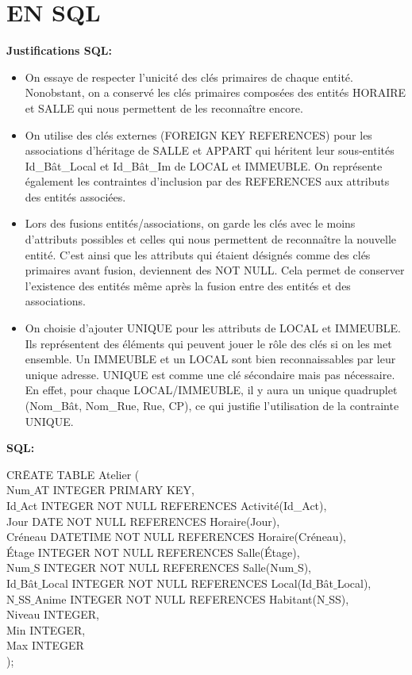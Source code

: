 \documentclass[a4paper,10.5pt]{report}
\begin{document}
	\section*{EN SQL}
	\textbf{Justifications SQL\@: }
	\begin{itemize}
		\item On essaye de respecter l'unicité des clés primaires de chaque entité. Nonobstant, on a conservé les clés primaires composées des entités HORAIRE et SALLE qui nous permettent de les reconnaître encore. 
		\item On utilise des clés externes (FOREIGN KEY REFERENCES) pour les associations d'héritage de SALLE et APPART qui héritent leur sous-entités Id\_Bât\_Local et Id\_Bât\_Im de LOCAL et IMMEUBLE\@. On représente également les contraintes d'inclusion par des REFERENCES aux attributs des entités associées.
		\item Lors des fusions entités/associations, on garde les clés avec le moins d'attributs possibles et celles qui nous permettent de reconnaître la nouvelle entité. C'est ainsi que les attributs qui étaient désignés comme des clés primaires avant fusion, deviennent des NOT NULL\@. Cela permet de conserver l'existence des entités même après la fusion entre des entités et des associations.
		\item On choisie d'ajouter UNIQUE pour les attributs de LOCAL et IMMEUBLE\@. Ils représentent des éléments qui peuvent jouer le rôle des clés si on les met ensemble. Un IMMEUBLE et un LOCAL sont bien reconnaissables par leur unique adresse. UNIQUE est comme une clé sécondaire mais pas nécessaire. En effet, pour chaque LOCAL/IMMEUBLE, il y aura un unique quadruplet (Nom\_Bât, Nom\_Rue, Rue, CP), ce qui justifie l'utilisation de la contrainte UNIQUE\@.
		 
	\end{itemize}
	\textbf{SQL: }
		\begin{tabbing}
			CR\=EATE TABLE Atelier (\\
			\> Num$\_$AT INTEGER PRIMARY KEY,\\
			\> Id$\_$Act INTEGER NOT NULL REFERENCES Activité(Id\_Act),\\
			\> Jour DATE NOT NULL REFERENCES Horaire(Jour),\\
			\> Créneau DATETIME NOT NULL REFERENCES Horaire(Créneau),\\
			\> Étage INTEGER NOT NULL REFERENCES Salle(Étage),\\
			\> Num$\_$S INTEGER NOT NULL REFERENCES Salle(Num$\_$S),\\
			\> Id$\_$Bât$\_$Local INTEGER NOT NULL REFERENCES Local(Id$\_$Bât$\_$Local),\\
			\> N$\_$SS$\_$Anime  INTEGER NOT NULL REFERENCES Habitant(N$\_$SS),\\
			\> Niveau INTEGER,\\
			\> Min INTEGER,\\
			\> Max INTEGER\\);
		\end{tabbing}
\end{document}
